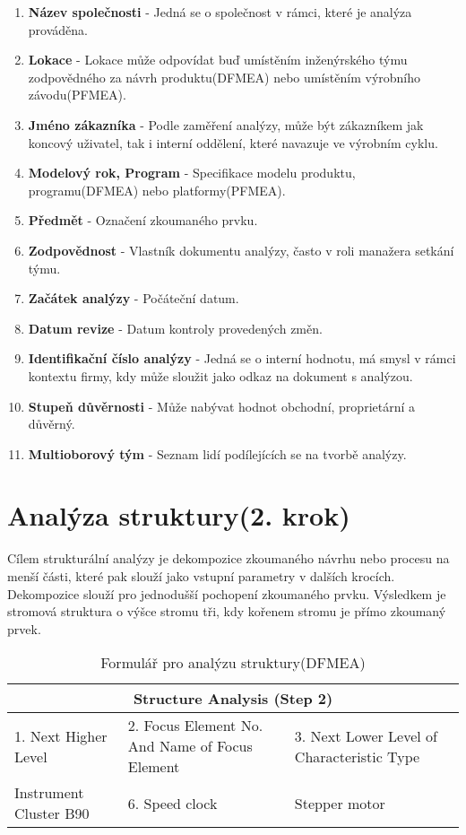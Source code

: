 \begin{enumerate}
	\item \textbf{Název společnosti} - Jedná se o společnost v rámci, které je analýza prováděna.
	\item \textbf{Lokace} - Lokace může odpovídat buď umístěním inženýrského týmu zodpovědného za návrh produktu(DFMEA) nebo umístěním výrobního závodu(PFMEA). 
	\item \textbf{Jméno zákazníka} - Podle zaměření analýzy, může být zákazníkem jak koncový uživatel, tak i interní oddělení, které navazuje ve výrobním cyklu.
 \item \textbf{Modelový rok, Program} - Specifikace modelu produktu, programu(DFMEA) nebo platformy(PFMEA).
 \item \textbf{Předmět} - Označení zkoumaného prvku.
 \item \textbf{Zodpovědnost} - Vlastník dokumentu analýzy, často v roli manažera setkání týmu.
 \item \textbf{Začátek analýzy} - Počáteční datum.
 \item \textbf{Datum revize} - Datum kontroly provedených změn.
 \item \textbf{Identifikační číslo analýzy} - Jedná se o interní hodnotu, má smysl v rámci kontextu firmy, kdy může sloužit jako odkaz na dokument s analýzou.
 \item \textbf{Stupeň důvěrnosti} - Může nabývat hodnot obchodní, proprietární a důvěrný.
 \item \textbf{Multioborový tým} - Seznam lidí podílejících se na tvorbě analýzy.
\end{enumerate}

\section{Analýza struktury(2. krok)}
\label{sec:FMEA_postup_2}
Cílem strukturální analýzy je dekompozice zkoumaného návrhu nebo procesu na menší části, které pak slouží jako vstupní parametry v dalších krocích. Dekompozice slouží pro jednodušší pochopení zkoumaného prvku. Výsledkem je stromová struktura o výšce stromu tři, kdy kořenem stromu je přímo zkoumaný prvek.

\begin{center}
\begin{table}[h]
	\centering
	\caption{Formulář pro analýzu struktury(DFMEA) }
	\label{tab:structure_DFMEA}
\begin{tabular}{ |p{5cm}|p{5cm}|p{5cm}|  }
 \hline
 \multicolumn{3}{|c|}{Structure Analysis (Step 2)} \\
 \hline
 1. Next Higher Level& 2. Focus Element
No. And Name of Focus Element &3. Next Lower Level of Characteristic Type\\
 \hline
 Instrument Cluster B90   & 6. Speed clock    &Stepper motor\\


 \hline
\end{tabular}\  
\end{table}
\end{center}

